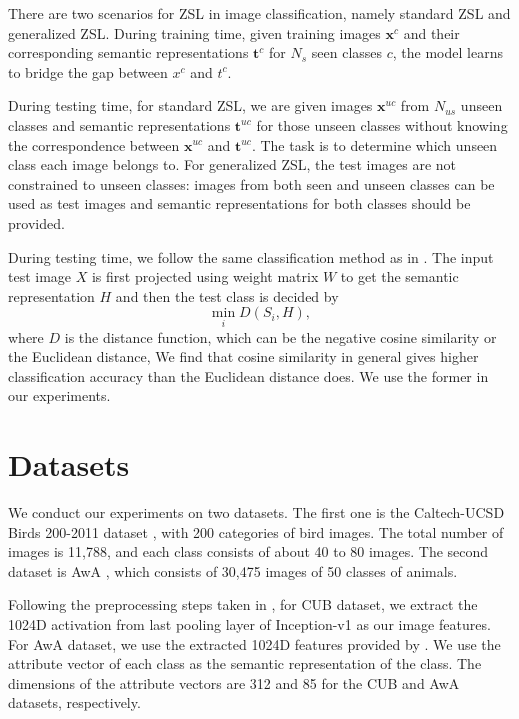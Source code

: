\documentclass{article}
\newcommand{\bb}[1]{\boldsymbol{#1}}
\begin{document}
	There are two scenarios for ZSL in image classification, namely standard ZSL and generalized ZSL. During training time, given training images $\bb{x}^c$ and their corresponding semantic representations $\bb{t}^c$ for $N_s$ seen classes $c$, the model learns to bridge the gap between $x^c$ and $t^c$. 
    
	During testing time, for standard ZSL, we are given images $\bb{x}^{uc}$ from $N_{us}$ unseen classes and semantic representations $\bb{t}^{uc}$ for those unseen classes without knowing the correspondence between $\bb{x}^{uc}$ and $\bb{t}^{uc}$. The task is to determine which unseen class each image belongs to. For generalized ZSL, the test images are not constrained to unseen classes: images from both seen and unseen classes can be used as test images and semantic representations for both classes should be provided.

During testing time, we follow the same classification method as in \cite{kodirov2017semantic}. The input test image $X$ is first projected using weight matrix $W$ to get the semantic representation $H$ and then the test class is decided by
\begin{equation}
	\min_i D(S_i, H),
\end{equation}
where $D$ is the distance function, which can be the negative cosine similarity or the Euclidean distance, We find that cosine similarity in general gives higher classification accuracy than the Euclidean distance does. We use the former in our experiments.



\section{Datasets}

We conduct our experiments on two datasets. The first one is the Caltech-UCSD Birds 200-2011 dataset \cite{wah2011caltech}, with 200 categories of bird images. The total number of images is 11,788, and each class consists of about 40 to 80 images. The second dataset is AwA \cite{lampert2014attribute}, which consists of 30,475 images of 50 classes of animals.

Following the preprocessing steps taken in \cite{kodirov2017semantic}, for CUB dataset, we extract the 1024D activation from last pooling layer of Inception-v1 \cite{szegedy2015going} as our image features. For AwA dataset, we use the extracted 1024D features provided by \cite{kodirov2017semantic}. We use the attribute vector of each class as the semantic representation of the class. The dimensions of the attribute vectors are 312 and 85 for the CUB and AwA datasets, respectively.
\end{document}
